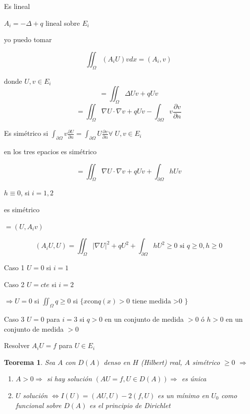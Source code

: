 \documentclass[a4paper,10pt]{book}
\newtheorem{theorem}{Teorema}
\begin{document}
Es lineal

$A_i = -\Delta +q $ lineal sobre $E_i$

yo puedo tomar

\[
\iint_{\Omega} (A_i U) v dx = (A_i,v)  \]

 donde $U,v\in E_i$ 
\[
= \iint_{\Omega} \Delta U  v + q U v 
\]
\[
= \iint_{\Omega} \nabla U \cdot \nabla v + q Uv - \int_{\partial \Omega} v \frac{\partial v}{ \partial n}
\] 

Es simétrico si $\int_{\partial \Omega} v\frac{\partial U}{\partial n} = \int_{\partial \Omega} U \frac{\partial v }{\partial n} \forall \; U,v \in E_i$

en los tres epacios es simétrico 

\[
=\iint_{\Omega} \nabla U \cdot \nabla v + q U v + \int_{\partial \Omega} h U v 
\]

$h\equiv 0$, si $i=1,2$

es simétrico

$=(U,A_iv)$

\[
(A_i U , U) = \iint_\Omega |\nabla U |^2 + q U^2 + \int_{\partial \Omega} h U^2 \geq 0 \text{  si  } q\geq 0, h\geq 0
\]

Caso 1 $U=0$ si $i=1$

Caso 2 $U=cte$ si $i=2$

$\Rightarrow U=0$ si $\iint_\Omega q \geq 0 $  si $\{ x \text{con} q(x) >0 \text{ tiene medida >0 } \}$


Caso 3 $U=0$ para $i=3$ si $q>0$ en un conjunto de medida $>0$ ó $h>0$ en un conjunto de medida $>0$

Resolver $A_i U= f $  para $U\in E_i$

\begin{theorem}
    Sea $A$ con $D(A)$ denso en $H$ (Hilbert) real, $A$ simétrico $\geq 0$ 
    $\Rightarrow$  
    \begin{enumerate}
        \item $A>0 \Rightarrow$ si hay solución $(A U =f, U \in D(A) )\Rightarrow $ es única 
        \item $U$ solución $\Leftrightarrow I(U) = (AU,U) -2(f,U) $ es un mínimo en $U_0$ como funcional sobre $D(A)$
        es el principio de Dirichlet
    \end{enumerate}
\end{theorem}
\end{document}
